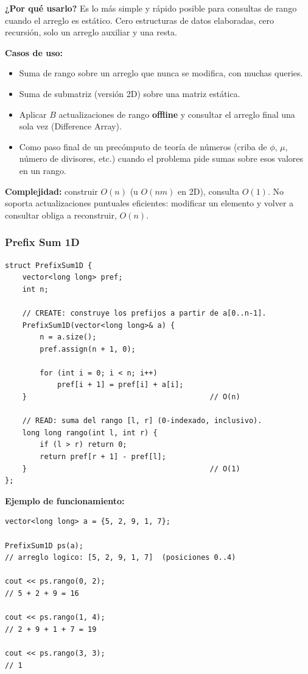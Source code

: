\documentclass[10pt,a4paper,twocolumn]{article}
\begin{document}
\textbf{¿Por qué usarlo?} Es lo más simple y rápido posible para
consultas de rango cuando el arreglo es estático. Cero estructuras de
datos elaboradas, cero recursión, solo un arreglo auxiliar y una
resta.

\textbf{Casos de uso:}

\begin{itemize}
    \item Suma de rango sobre un arreglo que nunca se modifica, con
    muchas queries.
    \item Suma de submatriz (versión 2D) sobre una matriz estática.
    \item Aplicar $B$ actualizaciones de rango \textbf{offline} y
    consultar el arreglo final una sola vez (Difference Array).
    \item Como paso final de un precómputo de teoría de números
    (criba de $\phi$, $\mu$, número de divisores, etc.) cuando el
    problema pide sumas sobre esos valores en un rango.
\end{itemize}

\textbf{Complejidad:} construir $O(n)$ (u $O(nm)$ en 2D), consulta
$O(1)$. No soporta actualizaciones puntuales eficientes: modificar un
elemento y volver a consultar obliga a reconstruir, $O(n)$.


\subsubsection{Prefix Sum 1D}

\begin{lstlisting}[style=cpp]
struct PrefixSum1D {
    vector<long long> pref;
    int n;

    // CREATE: construye los prefijos a partir de a[0..n-1].
    PrefixSum1D(vector<long long>& a) {
        n = a.size();
        pref.assign(n + 1, 0);

        for (int i = 0; i < n; i++)
            pref[i + 1] = pref[i] + a[i];
    }                                          // O(n)

    // READ: suma del rango [l, r] (0-indexado, inclusivo).
    long long rango(int l, int r) {
        if (l > r) return 0;
        return pref[r + 1] - pref[l];
    }                                          // O(1)
};
\end{lstlisting}

\textbf{Ejemplo de funcionamiento:}

\begin{lstlisting}[style=cpp]
vector<long long> a = {5, 2, 9, 1, 7};

PrefixSum1D ps(a);
// arreglo logico: [5, 2, 9, 1, 7]  (posiciones 0..4)

cout << ps.rango(0, 2);
// 5 + 2 + 9 = 16

cout << ps.rango(1, 4);
// 2 + 9 + 1 + 7 = 19

cout << ps.rango(3, 3);
// 1
\end{lstlisting}
\end{document}
